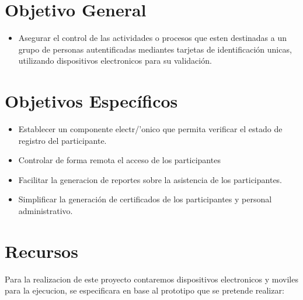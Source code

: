 \documentclass[letter,12pt]{article}
\begin{document}
\section{Objetivo General}
	\begin{itemize}
		\item Asegurar el control de las actividades o procesos que esten destinadas a un grupo de personas autentificadas mediantes tarjetas de identificaci\'on unicas, utilizando dispositivos electronicos para su validaci\'on.
	\end{itemize}

\section{Objetivos Espec\'ificos}
	\begin{itemize}
	
		\item Establecer un componente electr/'onico que permita verificar el estado de registro del participante.
		\item Controlar de forma remota el acceso de los participantes
		\item Facilitar la generacion de reportes sobre la asistencia de los participantes.
		\item Simplificar la generaci\'on de certificados de los participantes y personal administrativo. 
	\end{itemize}

\section{Recursos}

Para la realizacion de este proyecto contaremos dispositivos electronicos y moviles para la ejecucion, se especificara en base al prototipo que se pretende realizar:\\

\pagebreak
\end{document}
